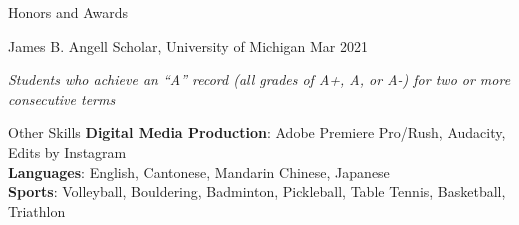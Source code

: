 \documentclass{resume}
\begin{document}
\begin{rSection}{Honors and Awards}
	\begin{rSubsection}{James B. Angell Scholar}{, University of Michigan \hfill Mar 2021}
        \item \textit{Students who achieve an “A” record (all grades of A+, A, or A-) for two or more consecutive terms}
	\end{rSubsection}
\end{rSection}

\begin{rSection}{Other Skills}
    \textbf{Digital Media Production}: Adobe Premiere Pro/Rush, Audacity, Edits by Instagram\\
    \textbf{Languages}: English, Cantonese, Mandarin Chinese, Japanese\\
    \textbf{Sports}: Volleyball, Bouldering, Badminton, Pickleball, Table Tennis, Basketball, Triathlon
\end{rSection}
\end{document}
